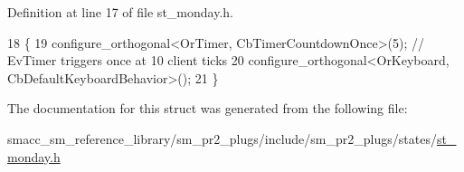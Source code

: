 Definition at line 17 of file st\+\_\+monday.\+h.


\begin{DoxyCode}
18     \{
19         configure\_orthogonal<OrTimer, CbTimerCountdownOnce>(5); \textcolor{comment}{// EvTimer triggers once at 10 client ticks}
20         configure\_orthogonal<OrKeyboard, CbDefaultKeyboardBehavior>();
21     \}
\end{DoxyCode}


The documentation for this struct was generated from the following file\+:\begin{DoxyCompactItemize}
\item 
smacc\+\_\+sm\+\_\+reference\+\_\+library/sm\+\_\+pr2\+\_\+plugs/include/sm\+\_\+pr2\+\_\+plugs/states/\hyperlink{sm__pr2__plugs_2include_2sm__pr2__plugs_2states_2st__monday_8h}{st\+\_\+monday.\+h}\end{DoxyCompactItemize}
